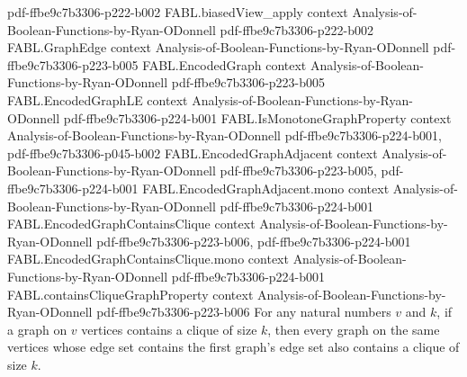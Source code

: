 \begin{theorem}
  {pdf-ffbe9c7b3306-p222-b002}
\proofstep
  {FABL.biasedView_apply}
  {context}
  {Analysis-of-Boolean-Functions-by-Ryan-ODonnell}
  {pdf-ffbe9c7b3306-p222-b002}
\proofstep
  {FABL.GraphEdge}
  {context}
  {Analysis-of-Boolean-Functions-by-Ryan-ODonnell}
  {pdf-ffbe9c7b3306-p223-b005}
\proofstep
  {FABL.EncodedGraph}
  {context}
  {Analysis-of-Boolean-Functions-by-Ryan-ODonnell}
  {pdf-ffbe9c7b3306-p223-b005}
\proofstep
  {FABL.EncodedGraphLE}
  {context}
  {Analysis-of-Boolean-Functions-by-Ryan-ODonnell}
  {pdf-ffbe9c7b3306-p224-b001}
\proofstep
  {FABL.IsMonotoneGraphProperty}
  {context}
  {Analysis-of-Boolean-Functions-by-Ryan-ODonnell}
  {pdf-ffbe9c7b3306-p224-b001,
    pdf-ffbe9c7b3306-p045-b002}
\proofstep
  {FABL.EncodedGraphAdjacent}
  {context}
  {Analysis-of-Boolean-Functions-by-Ryan-ODonnell}
  {pdf-ffbe9c7b3306-p223-b005,
    pdf-ffbe9c7b3306-p224-b001}
\proofstep
  {FABL.EncodedGraphAdjacent.mono}
  {context}
  {Analysis-of-Boolean-Functions-by-Ryan-ODonnell}
  {pdf-ffbe9c7b3306-p224-b001}
\proofstep
  {FABL.EncodedGraphContainsClique}
  {context}
  {Analysis-of-Boolean-Functions-by-Ryan-ODonnell}
  {pdf-ffbe9c7b3306-p223-b006,
    pdf-ffbe9c7b3306-p224-b001}
\proofstep
  {FABL.EncodedGraphContainsClique.mono}
  {context}
  {Analysis-of-Boolean-Functions-by-Ryan-ODonnell}
  {pdf-ffbe9c7b3306-p224-b001}
\proofstep
  {FABL.containsCliqueGraphProperty}
  {context}
  {Analysis-of-Boolean-Functions-by-Ryan-ODonnell}
  {pdf-ffbe9c7b3306-p223-b006}
For any natural numbers $v$ and $k$, if a graph on $v$ vertices contains a clique of
size $k$, then every graph on the same vertices whose edge set contains the first
graph's edge set also contains a clique of size $k$.
\end{theorem}

